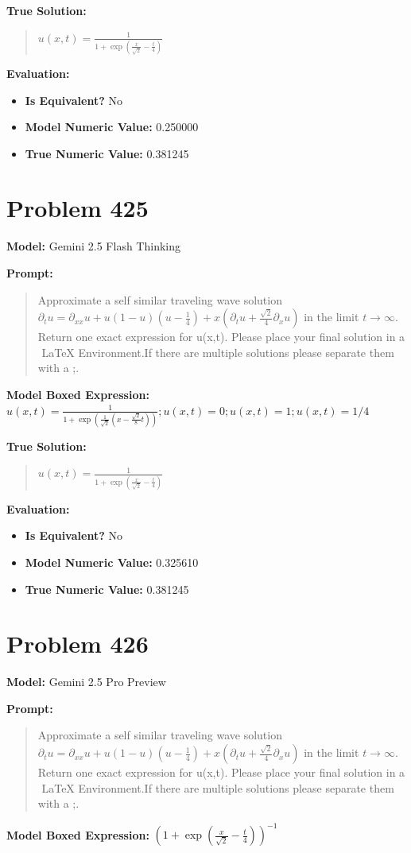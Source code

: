 \documentclass{article}
\begin{document}
\textbf{True Solution:}
\begin{quote}
$u(x,t) = \frac{1}{1+\exp{\left(\frac{x}{\sqrt{2}}-\frac{t}{4}\right)}}$
\end{quote}

\textbf{Evaluation:}
\begin{itemize}
\item \textbf{Is Equivalent?} No
\item \textbf{Model Numeric Value:} 0.250000
\item \textbf{True Numeric Value:} 0.381245
\end{itemize}
\vspace{1cm}
\section*{Problem 425}
\textbf{Model:} Gemini 2.5 Flash Thinking

\textbf{Prompt:}
\begin{quote}
Approximate a self similar traveling wave solution $ \partial_t u = \partial_{xx} u + u(1-u)(u-\frac{1}{4}) + x \left(\partial_t u + \frac{\sqrt{2}}{4} \partial_x u\right)$ in the limit $t \to \infty$. Return one exact expression for u(x,t). Please place your final solution in a $\boxed{}$ LaTeX Environment.If there are multiple solutions please separate them with a ;.
\end{quote}
\textbf{Model Boxed Expression:} $u(x,t) = \frac{1}{1+\exp\left(\frac{1}{\sqrt{2}}\left(x-\frac{\sqrt{2}}{8}t\right)\right)} ; u(x,t)=0 ; u(x,t)=1 ; u(x,t)=1/4$

\textbf{True Solution:}
\begin{quote}
$u(x,t) = \frac{1}{1+\exp{\left(\frac{x}{\sqrt{2}}-\frac{t}{4}\right)}}$
\end{quote}

\textbf{Evaluation:}
\begin{itemize}
\item \textbf{Is Equivalent?} No
\item \textbf{Model Numeric Value:} 0.325610
\item \textbf{True Numeric Value:} 0.381245
\end{itemize}
\vspace{1cm}
\section*{Problem 426}
\textbf{Model:} Gemini 2.5 Pro Preview

\textbf{Prompt:}
\begin{quote}
Approximate a self similar traveling wave solution $ \partial_t u = \partial_{xx} u + u(1-u)(u-\frac{1}{4}) + x \left(\partial_t u + \frac{\sqrt{2}}{4} \partial_x u\right)$ in the limit $t \to \infty$. Return one exact expression for u(x,t). Please place your final solution in a $\boxed{}$ LaTeX Environment.If there are multiple solutions please separate them with a ;.
\end{quote}
\textbf{Model Boxed Expression:} $\left(1+\exp\left(\frac{x}{\sqrt{2}}-\frac{t}{4}\right)\right)^{-1}$
\end{document}
